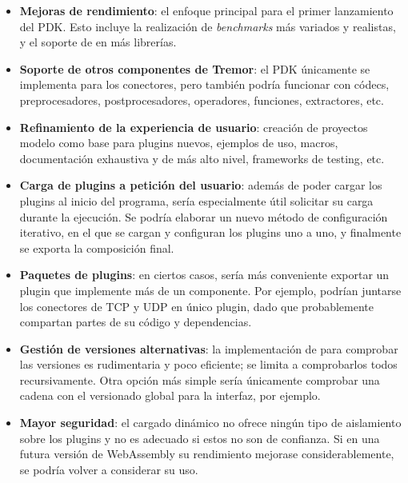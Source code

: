 \begin{itemize}
    \item \textbf{Mejoras de rendimiento}: el enfoque principal para el primer
        lanzamiento del PDK. Esto incluye la realización de \emph{benchmarks}
        más variados y realistas, y el soporte de \abistable en más librerías.

    \item \textbf{Soporte de otros componentes de Tremor}: el PDK únicamente se
        implementa para los conectores, pero también podría funcionar con
        códecs, preprocesadores, postprocesadores, operadores, funciones,
        extractores, etc.

    \item \textbf{Refinamiento de la experiencia de usuario}: creación de
        proyectos modelo como base para plugins nuevos, ejemplos de uso, macros,
        documentación exhaustiva y de más alto nivel, frameworks de testing,
        etc.

    \item \textbf{Carga de plugins a petición del usuario}: además de poder
        cargar los plugins al inicio del programa, sería especialmente útil
        solicitar su carga durante la ejecución. Se podría elaborar un nuevo
        método de configuración iterativo, en el que se cargan y configuran los
        plugins uno a uno, y finalmente se exporta la composición final.

    \item \textbf{Paquetes de plugins}: en ciertos casos, sería más conveniente
        exportar un plugin que implemente más de un componente. Por ejemplo,
        podrían juntarse los conectores de TCP y UDP en único plugin, dado que
        probablemente compartan partes de su código y dependencias.

    \item \textbf{Gestión de versiones alternativas}: la implementación de
        \abistable para comprobar las versiones es rudimentaria y poco
        eficiente; se limita a comprobarlos todos recursivamente. Otra opción
        más simple sería únicamente comprobar una cadena con el versionado
        global para la interfaz, por ejemplo.

    \item \textbf{Mayor seguridad}: el cargado dinámico no ofrece ningún tipo de
        aislamiento sobre los plugins y no es adecuado si estos no son de
        confianza. Si en una futura versión de WebAssembly su rendimiento
        mejorase considerablemente, se podría volver a considerar su uso.


\end{itemize}
